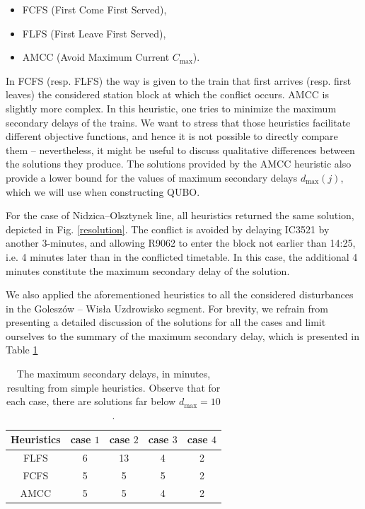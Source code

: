 \begin{itemize}
  \item FCFS (First Come First Served),
  \item FLFS (First Leave First Served),
  \item AMCC (Avoid Maximum Current $C_{\max}$).
\end{itemize}

In FCFS (resp. FLFS) the way is given to the train that first arrives (resp.
first leaves) the considered station block at which the conflict occurs. AMCC
\cite{mascis2002job} is slightly more complex. In this heuristic, one tries to
minimize the maximum secondary delays of the trains. We want to stress that
those heuristics facilitate different objective functions, and hence it is not
possible to directly compare them -- nevertheless, it might be useful to
discuss qualitative differences between the solutions they produce. The
solutions provided by the AMCC heuristic also provide a lower bound for the
values of maximum secondary delays $d_{\max}(j)$, which we will use when
constructing QUBO.

For the case of Nidzica--Olsztynek line, all heuristics returned the same
solution, depicted in Fig. \ref{resolution}. The conflict is avoided by
delaying IC3521 by another 3-minutes, and allowing R9062 to enter the block not
earlier than 14:25, i.e. 4 minutes later than in the conflicted timetable. In
this case, the additional 4 minutes constitute the maximum secondary delay of
the solution.

We also applied the aforementioned heuristics to all the considered
disturbances in the Goleszów -- Wisła Uzdrowisko segment. For brevity, we
refrain from presenting a detailed discussion of the solutions for all the
cases and limit ourselves to the summary of the maximum secondary delay, which
is presented in Table \ref{tab:simple}

\begin{table}[bh]
  \centering
  \begin{tabular}{|c|c|c|c|c|}
    \hline
    \rowcolor{theader} Heuristics & case $1$ & case $2$ & case $3$ & case $4$ \\
    \hline
    FLFS                          & 6        & 13       & 4        & 2        \\
    \hline
    FCFS                          & 5        & 5        & 5        & 2        \\
    \hline
    AMCC                          & 5        & 5        & 4        & 2        \\
    \hline
  \end{tabular}
  \caption{The maximum secondary delays, in minutes, resulting from simple heuristics.
    Observe that for each case, there are solutions far below $d_{\text{max}} =
      10$.} \label{tab:simple}
\end{table}


